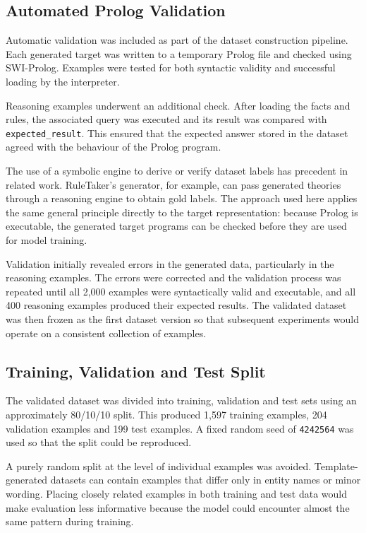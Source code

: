 \documentclass[11pt]{article} %
\theoremstyle{plain}
\theoremstyle{definition}
\begin{document}
\subsection{Automated Prolog Validation}

Automatic validation was included as part of the dataset construction pipeline.
Each generated target was written to a temporary Prolog file and checked using
SWI-Prolog. Examples were tested for both syntactic validity and successful
loading by the interpreter.

Reasoning examples underwent an additional check. After loading the facts and
rules, the associated query was executed and its result was compared with
\texttt{expected\_result}. This ensured that the expected answer stored in the
dataset agreed with the behaviour of the Prolog program.

The use of a symbolic engine to derive or verify dataset labels has precedent in
related work. RuleTaker's generator, for example, can pass generated theories
through a reasoning engine to obtain gold labels. The approach used here applies
the same general principle directly to the target representation: because Prolog
is executable, the generated target programs can be checked before they are used
for model training.

Validation initially revealed errors in the generated data, particularly in the
reasoning examples. The errors were corrected and the validation process was
repeated until all 2,000 examples were syntactically valid and executable, and
all 400 reasoning examples produced their expected results. The validated
dataset was then frozen as the first dataset version so that subsequent
experiments would operate on a consistent collection of examples.

\subsection{Training, Validation and Test Split}

The validated dataset was divided into training, validation and test sets using
an approximately 80/10/10 split. This produced 1,597 training examples, 204
validation examples and 199 test examples. A fixed random seed of
\texttt{4242564} was used so that the split could be reproduced.

A purely random split at the level of individual examples was avoided.
Template-generated datasets can contain examples that differ only in entity
names or minor wording. Placing closely related examples in both training and
test data would make evaluation less informative because the model could
encounter almost the same pattern during training.
\end{document}
